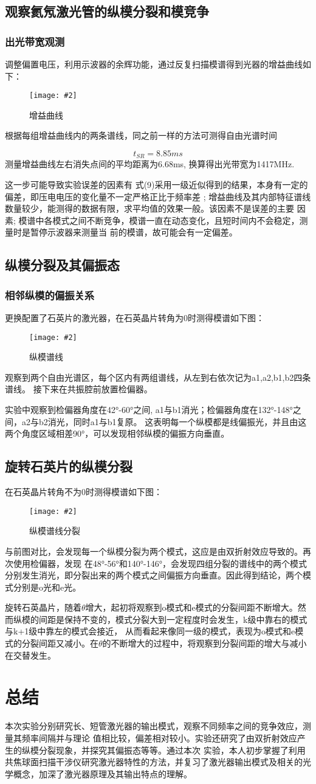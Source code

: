 \documentclass[12pt,a4paper]{article}
\newcommand{\be}[1]{
    \begin{equation}
        #1
    \end{equation}
}
\newcommand{\bfig}[3]{
    \begin{figure}[H]
        \centering
        \texttt{[image: \#2]}
        \caption{#3}
    \end{figure}
}
\begin{document}
\subsection{观察氦氖激光管的纵模分裂和模竞争}
\subsubsection{出光带宽观测}
调整偏置电压，利用示波器的余辉功能，通过反复扫描模谱得到光器的增益曲线如下：
\bfig{0.7}{增益曲线.jpeg}{增益曲线}
根据每组增益曲线内的两条谱线，同之前一样的方法可测得自由光谱时间
\be{t_{SR}=8.85ms}测量增益曲线左右消失点间的平均距离为6.68ms, 换算得出光带宽为1417MHz.

这一步可能导致实验误差的因素有
式(9)采用一级近似得到的结果，本身有一定的偏差，即压电电压的变化量不一定严格正比于频率差
; 增益曲线及其内部特征谱线数量较少，能测得的数据有限，求平均值的效果一般。该因素不是误差的主要
因素; 模谱中各模式之间不断竞争，模谱一直在动态变化，且短时间内不会稳定，测量时是暂停示波器来测量当
前的模谱，故可能会有一定偏差。
\subsection{纵模分裂及其偏振态}
\subsubsection{相邻纵模的偏振关系}
更换配置了石英片的激光器，在石英晶片转角为0时测得模谱如下图：
\bfig{0.7}{偏振谱.jpeg}{纵模谱线}
观察到两个自由光谱区，每个区内有两组谱线，从左到右依次记为a1,a2,b1,b2四条谱线。
接下来在共振腔前放置检偏器。

实验中观察到检偏器角度在42°-60°之间, a1与b1消光；检偏器角度在132°-148°之间，a2与b2消光，同时a1与b1复原。
这表明每一个纵模都是线偏振光，并且由这两个角度区域相差90°，可以发现相邻纵模的偏振方向垂直。
\subsection{旋转石英片的纵模分裂}
在石英晶片转角不为0时测得模谱如下图：
\bfig{0.7}{偏振分裂.jpeg}{纵模谱线分裂}
与前图对比，会发现每一个纵模分裂为两个模式，这应是由双折射效应导致的。再次使用检偏器，发现
在48°-56°和140°-146°，会发现四组分裂的谱线中的两个模式分别发生消光，即分裂出来的两个模式之间偏振方向垂直。因此得到结论，两个模式分别是o光和e光。

旋转石英晶片，随着$\theta$增大，起初将观察到o模式和e模式的分裂间距不断增大。然而纵模的间距是保持不变的，模式分裂大到一定程度时会发生，k级中靠右的模式与k+1级中靠左的模式会接近，
从而看起来像同一级的模式，表现为o模式和e模式的分裂间距又减小。在$\theta$的不断增大的过程中，将观察到分裂间距的增大与减小在交替发生。
\section{总结}
本次实验分别研究长、短管激光器的输出模式，观察不同频率之间的竞争效应，测量其频率间隔并与理论
值相比较，偏差相对较小。实验还研究了由双折射效应产生的纵模分裂现象，并探究其偏振态等等。通过本次
实验，本人初步掌握了利用共焦球面扫描干涉仪研究激光器特性的方法，并复习了激光器输出模式及相关的光
学概念，加深了激光器原理及其输出特点的理解。


\printbibliography
\end{document}
